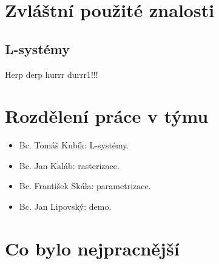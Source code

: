 \documentclass[11pt,a4paper]{article}
\begin{document}
\section{Zvláštní použité znalosti}

%

\subsection{L-systémy}
Herp derp hurrr durrr1!!!

\section{Rozdělení práce v týmu}

%

\begin{itemize}
\item Bc. Tomáš Kubík: L-systémy.
\item Bc. Jan Kaláb: rasterizace.
\item Bc. František Skála: parametrizace.
\item Bc. Jan Lipovský: demo.
\end{itemize}

\section{Co bylo nejpracnější}

%
\end{document}
